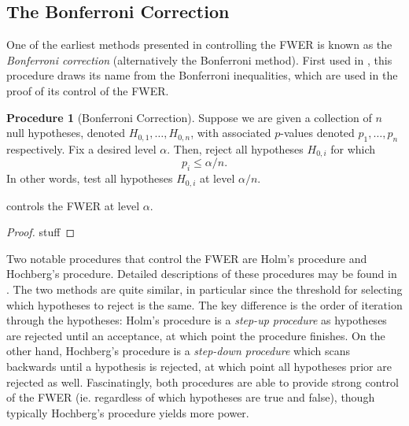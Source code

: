 \documentclass[11pt,reqno]{report}
\theoremstyle{definition}
\newtheorem{proc}[theorem]{Procedure}
\numberwithin{equation}{section}
\begin{document}
\subsection{The Bonferroni Correction}
One of the earliest methods presented in controlling the FWER is known as the \emph{Bonferroni correction} (alternatively the Bonferroni method). First used in \cite{dunn}, this procedure draws its name from the Bonferroni inequalities, which are used in the proof of its control of the FWER.
\begin{proc}[Bonferroni Correction]
\label{bonfcorr}
Suppose we are given a collection of $n$ null hypotheses, denoted $H_{0, 1}, \ldots, H_{0, n}$, with associated $p$-values denoted $p_1, \ldots, p_n$ respectively. Fix a desired level $\alpha$. Then, reject all hypotheses $H_{0, i}$ for which
\begin{equation}
p_i \leq \alpha / n.
\end{equation} In other words, test all hypotheses $H_{0, i}$ at level $\alpha / n$.
\end{proc}
\begin{prop}
 controls the FWER at level $\alpha$.
\end{prop}
\begin{proof}
stuff
\end{proof}



Two notable procedures that control the FWER are Holm's procedure and Hochberg's procedure. Detailed descriptions of these procedures may be found in \cite{stat300}. The two methods are quite similar, in particular since the threshold for selecting which hypotheses to reject is the same. The key difference is the order of iteration through the hypotheses: Holm's procedure is a \emph{step-up procedure} as hypotheses are rejected until an acceptance, at which point the procedure finishes. On the other hand, Hochberg's procedure is a \emph{step-down procedure} which scans backwards until a hypothesis is rejected, at which point all hypotheses prior are rejected as well. Fascinatingly, both procedures are able to provide strong control of the FWER (ie. regardless of which hypotheses are true and false), though typically Hochberg's procedure yields more power.
\end{document}
